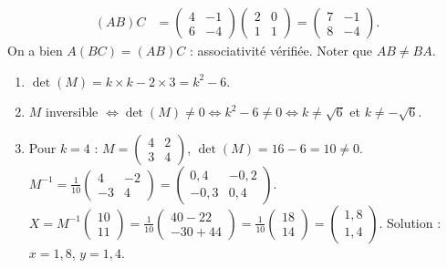 \documentclass[11pt]{article}
\begin{document}
\begin{corrige}[Exercice 1]
\begin{align*}
(AB)C &= \begin{pmatrix} 4 & -1 \\ 6 & -4 \end{pmatrix}\begin{pmatrix} 2 & 0 \\ 1 & 1 \end{pmatrix} = \begin{pmatrix} 7 & -1 \\ 8 & -4 \end{pmatrix}.
\end{align*}
On a bien $A(BC)=(AB)C$ : associativité vérifiée. Noter que $AB\neq BA$.
\end{corrige}

\begin{corrige}[Exercice 2]
\begin{enumerate}
\item $\det(M)=k\times k - 2\times 3 = k^2-6$.
\item $M$ inversible $\iff \det(M)\neq 0 \iff k^2-6\neq 0 \iff k\neq \sqrt{6}$ et $k\neq -\sqrt{6}$.
\item Pour $k=4$ : $M=\begin{pmatrix} 4 & 2 \\ 3 & 4 \end{pmatrix}$, $\det(M)=16-6=10\neq 0$.
$M^{-1}=\frac{1}{10}\begin{pmatrix} 4 & -2 \\ -3 & 4 \end{pmatrix}=\begin{pmatrix} 0,4 & -0,2 \\ -0,3 & 0,4 \end{pmatrix}$.
$X=M^{-1}\begin{pmatrix} 10 \\ 11 \end{pmatrix}=\frac{1}{10}\begin{pmatrix} 40-22 \\ -30+44 \end{pmatrix}=\frac{1}{10}\begin{pmatrix} 18 \\ 14 \end{pmatrix}=\begin{pmatrix} 1,8 \\ 1,4 \end{pmatrix}$.
Solution : $x=1,8$, $y=1,4$.
\end{enumerate}
\end{corrige}
\end{document}
